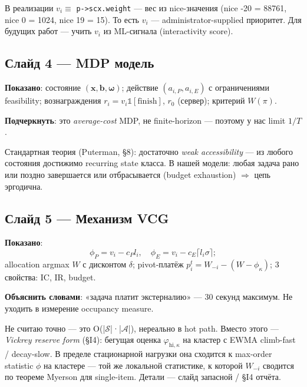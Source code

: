 \documentclass[11pt,a4paper]{article}
\begin{document}
\begin{ask}
В реализации $v_i \equiv$ \texttt{p->scx.weight} — вес из nice-значения
(nice -20 = 88761, nice 0 = 1024, nice 19 = 15). То есть $v_i$ —
administrator-supplied приоритет. Для будущих работ — учить $v_i$ из
ML-сигнала (interactivity score).
\end{ask}

\subsection*{Слайд 4 — MDP модель}

\textbf{Показано}: состояние $(\mathbf x,\mathbf b,\boldsymbol\omega)$;
действие $(a_{i,P},a_{i,E})$ с ограничениями feasibility;
вознаграждения $r_i=v_i\mathbb{1}[\text{finish}]$, $r_0$ (сервер);
критерий $W(\pi)$.

\textbf{Подчеркнуть}: это \emph{average-cost} MDP, не finite-horizon —
поэтому у нас limit $1/T$.

\begin{ask}
Стандартная теория (Puterman, \S8): достаточно \emph{weak
accessibility} — из любого состояния достижимо recurring state
класса. В нашей модели: любая задача рано или поздно завершается или
отбрасывается (budget exhaustion) $\Rightarrow$ цепь эргодична.
\end{ask}

\subsection*{Слайд 5 — Механизм VCG}

\textbf{Показано}:
\[
\phi_P = v_i - c_P l_i,\quad \phi_E = v_i - c_E\lceil l_i\sigma\rceil;
\]
allocation argmax $W$ с дисконтом $\delta$; pivot-платёж
$p_i^t=W_{-i}-(W-\phi_\kappa)$; 3 свойства: IC, IR, budget.

\textbf{Объяснить словами}: «задача платит экстерналию» — 30 секунд
максимум. Не уходить в измерение occupancy measure.

\begin{ask}
Не считаю точно — это O(|$\mathcal{S}$|·|$\mathcal{A}$|), нереально в
hot path. Вместо этого — \emph{Vickrey reserve form} (§I4): бегущая
оценка $\varphi_{\text{hi},\kappa}$ на кластер с EWMA climb-fast /
decay-slow. В пределе стационарной нагрузки она сходится к
max-order statistic $\phi$ на кластере — той же локальной статистике,
к которой $W_{-i}$ сводится по теореме Myerson для single-item.
Детали — слайд запасной / §I4 отчёта.
\end{ask}
\end{document}

